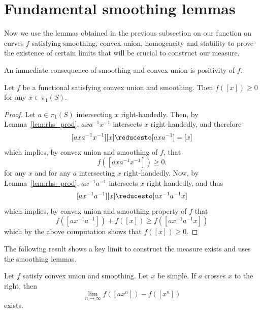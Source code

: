 \section{Fundamental smoothing lemmas}


Now we use the lemmas obtained in the previous subsection on our function on curves $f$ satisfying smoothing, convex union, homogeneity and stability to prove the existence of certain limits that will be crucial to construct our measure.

An immediate consequence of smoothing and convex union is positivity of $f$.

\begin{corollary}
  Let $f$ be a functional satisfying convex union and smoothing. Then $f([x]) \geq 0$ for any $x \in \pi_1(S)$.
  \label{cor:positivity}
\end{corollary}
\begin{proof}
Let $a \in \pi_1(S)$ intersecting $x$ right-handedly. Then, by Lemma~\ref{lem:rhs_prod}, $axa^{-1}x^{-1}$ intersects $x$ right-handedly, and therefore
\[
    [axa^{-1}x^{-1}][x]  \reducesto [axa^{-1}]=[x]
\]
which implies, by convex union and smoothing of $f$, that
\[
    f([axa^{-1}x^{-1}]) \geq 0.
\]
for any $x$ and for any $a$ intersecting $x$ right-handedly.
Now, by Lemma~\ref{lem:rhs_prod}, $ax^{-1}a^{-1}$ intersects $x$ right-handedly, and thus
\[
    [ax^{-1}a^{-1}][x]  \reducesto [ax^{-1}a^{-1}x]
\]
which implies, by convex union and smoothing property of $f$ that
\[
    f([ax^{-1}a^{-1}]) + f([x]) \geq f([ax^{-1}a^{-1}x])
\]
which by the above computation shows that $f([x]) \geq 0$.
\end{proof}

The following result shows a key limit to construct the measure exists and uses the smoothing lemmas.

\begin{corollary}\label{cor:additivity-limit}
Let $f$ satisfy convex union and smoothing.
  Let $x$ be simple. If $a$ crosses $x$ to the right, then
  \[
    \lim_{n \to \infty} f([a x^n]) - f([x^n])
  \]
  exists.
\end{corollary}

